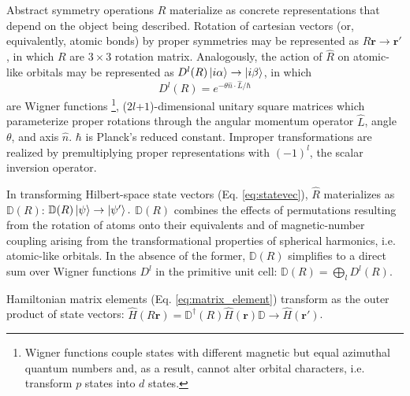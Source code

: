 \documentclass[twocolumn,showpacs,preprintnumbers,superscriptaddress,prb,floatfix,aps,10pt]{revtex4-1}
\newcommand{\abmei}[1]{\textcolor{orange}{ \bf [Antonio: #1] }}
\renewcommand{\vec}[1]{\ensuremath{\mathbf{#1}}}
\newcommand*{\ham}{\hat{H}}
\newcommand*{\wignerD}{\mathbb{D}}%
\newcommand*{\wignerDl}{D^{l}}%
\newcommand*{\bondvec}{\vec{r}_{ij}}
\begin{document}
Abstract symmetry operations $\hat{R}$ materialize as concrete representations that depend on the object being described. Rotation of cartesian vectors (or, equivalently, atomic bonds) by proper symmetries may be represented as $ R \vec{r} \rightarrow \vec{r} '$, in which $R$ are $3\times3$ rotation matrix. Analogously, the action of $\hat{R}$ on atomic-like orbitals may be represented as $\wignerDl(R)\ket{i\alpha} \rightarrow \ket{i\beta}$, in which 
\begin{equation}
\wignerDl(R) = e^{- \theta \hat{n} \cdot \hat{L} /\hbar}
\end{equation}
are Wigner functions \footnote{Wigner functions couple states with different magnetic but equal azimuthal quantum numbers and, as a result, cannot alter orbital characters, i.e. transform $p$ states into $d$ states.}, ($2l$+$1$)-dimensional unitary square matrices which parameterize proper rotations through the angular momentum operator $\hat{L}$, angle $\theta$, and axis $\hat{n}$. $\hbar$ is Planck's reduced constant. Improper transformations are realized by premultiplying proper representations with $(-1)^l$, the scalar inversion operator.\cite{sharma_general_1979,el-batanouny_symmetry_2008} %

In transforming Hilbert-space state vectors (Eq. \ref{eq:statevec}), $\hat{R}$ materializes as $\wignerD(R)$: $\wignerD(R) \ket{\psi} \rightarrow \ket{\psi'}.$ $\wignerD(R)$ combines the effects of permutations resulting from the rotation of atoms onto their equivalents and of magnetic-number coupling arising from the transformational properties of spherical harmonics, i.e. atomic-like orbitals. In the absence of the former, $\wignerD(R)$ simplifies to a direct sum over Wigner functions $\wignerDl$ in the primitive unit cell: $\wignerD(R) = \bigoplus_l \wignerDl(R)$.

Hamiltonian matrix elements (Eq. \ref{eq:matrix_element}) transform as the outer product of state vectors: $\ham( R\vec{r}) = \mathbb{D}^\dag(R) \ham(\vec{r}) \wignerD \rightarrow \ham(\vec{r}')$.\cite{el-batanouny_symmetry_2008} %



%
%
%
%
\end{document}
